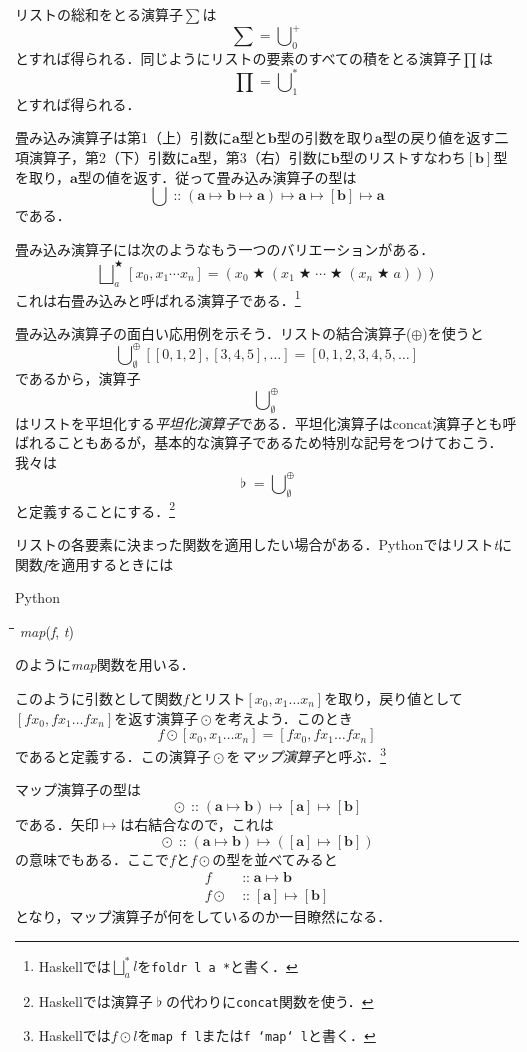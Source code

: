 \documentclass[twocolumn]{jsbook}
\newcommand{\keyword}[1]{{\emph{#1}}}
\newcommand{\code}[1]{\texttt{#1}}
\newenvironment{pythoncode}{\begin{itembox}[r]{Python}}{\end{itembox}}
\newenvironment{python}{\begin{tabbing}\hspace*{1em}\=\hspace*{1em}\=\hspace*{1em}\=\hspace*{1em}\=\kill}{\end{tabbing}}
\newcommand{\pthnId}[1]{\textit{#1}}
\newcommand{\hsklType}[1]{\textbf{#1}}
\DeclareMathOperator{\hsklConcat}{\flat}
\DeclareMathOperator{\hsklMap}{\odot}
\DeclareMathOperator{\hsklOf}{::}
\newcommand{\hsklAppend}{\oplus}
\newcommand{\hsklEmptyList}{\emptyset}
\newcommand{\hsklListType}[1]{[#1]}
\DeclareMathOperator{\mathAnyBinaryOperator}{\bigstar}
\DeclareMathOperator{\mathIn}{::}
\DeclareMathOperator*{\mathFold}{\bigcup}
\DeclareMathOperator*{\mathFoldRight}{\bigsqcup}
\DeclareMathOperator{\mathMapsTo}{\mapsto}
\newcommand{\mathMorph}[2]{#1\mathMapsTo#2}
\newcommand{\mathMorphII}[3]{#1\mathMapsTo#2\mathMapsTo#3}
\newcommand{\mathMorphIII}[4]{#1\mathMapsTo#2\mathMapsTo#3\mathMapsTo#4}
\begin{document}
リストの総和をとる演算子$\sum$は$$\sum=\mathFold^+_0$$とすれば得られる．同じようにリストの要素のすべての積をとる演算子$\prod$は$$\prod=\mathFold^*_1$$とすれば得られる．

畳み込み演算子は第1（上）引数に$\hsklType{a}$型と$\hsklType{b}$型の引数を取り$\hsklType{a}$型の戻り値を返す二項演算子，第2（下）引数に$\hsklType{a}$型，第3（右）引数に$\hsklType{b}$型のリストすなわち$\hsklListType{\hsklType{b}}$型を取り，$\hsklType{a}$型の値を返す．従って畳み込み演算子の型は$$\mathFold\mathIn\mathMorphIII{(\mathMorphII{\hsklType{a}}{\hsklType{b}}{\hsklType{a}})}{\hsklType{a}}{\hsklListType{\hsklType{b}}}{\hsklType{a}}$$である．

畳み込み演算子には次のようなもう一つのバリエーションがある．$$\mathFoldRight^{\mathAnyBinaryOperator}_{a}[x_0,x_1\dotsb x_n]=\left(x_0\mathAnyBinaryOperator\left(x_1\mathAnyBinaryOperator\dotsb\mathAnyBinaryOperator\left(x_n\mathAnyBinaryOperator a\right)\right)\right)$$
これは右畳み込みと呼ばれる演算子である．\footnote{Haskellでは$\mathFoldRight^{*}_{a}l$を\code{foldr l a *}と書く．}

畳み込み演算子の面白い応用例を示そう．リストの結合演算子($\hsklAppend$)を使うと$$\mathFold_\hsklEmptyList^\hsklAppend[[0,1,2],[3,4,5],\dots]=[0,1,2,3,4,5,\dots]$$であるから，演算子$$\mathFold_\hsklEmptyList^\hsklAppend$$はリストを平坦化する\keyword{平坦化演算子}である．平坦化演算子はconcat演算子とも呼ばれることもあるが，基本的な演算子であるため特別な記号をつけておこう．我々は$$\hsklConcat=\mathFold_\hsklEmptyList^\hsklAppend$$と定義することにする．\footnote{Haskellでは演算子$\hsklConcat$の代わりに\code{concat}関数を使う．}

リストの各要素に決まった関数を適用したい場合がある．Pythonではリスト\pthnId{t}に関数\pthnId{f}を適用するときには
\begin{pythoncode}
\begin{python}
\pthnId{map}(\pthnId{f}, \pthnId{t})
\end{python}
\end{pythoncode}
のように\pthnId{map}関数を用いる．

このように引数として関数$f$とリスト$[x_0,x_1\dots x_n]$を取り，戻り値として$[fx_0,fx_1\dots fx_n]$を返す演算子$\hsklMap$を考えよう．このとき$$f\hsklMap[x_0,x_1\dots x_n]=[fx_0,fx_1\dots fx_n]$$であると定義する．この演算子$\hsklMap$を\keyword{マップ演算子}と呼ぶ．\footnote{Haskellでは$f\hsklMap l$を\code{map f l}または\code{f `map` l}と書く．}

マップ演算子の型は$$\hsklMap\hsklOf{}\mathMorphII{(\mathMorph{\hsklType{a}}{\hsklType{b}})}{\hsklListType{\hsklType{a}}}{\hsklListType{\hsklType{b}}}$$である．矢印$\mathMapsTo$は右結合なので，これは$$\hsklMap\hsklOf{}\mathMorph{(\mathMorph{\hsklType{a}}{\hsklType{b}})}{(\mathMorph{\hsklListType{\hsklType{a}}}{\hsklListType{\hsklType{b}}})}$$の意味でもある．ここで$f$と$f\hsklMap$の型を並べてみると
\begin{align*}
f&\mathIn\mathMorph{\hsklType{a}}{\hsklType{b}}\\
f\hsklMap&\mathIn\mathMorph{\hsklListType{\hsklType{a}}}{\hsklListType{\hsklType{b}}}
\end{align*}
となり，マップ演算子が何をしているのか一目瞭然になる．
\end{document}
